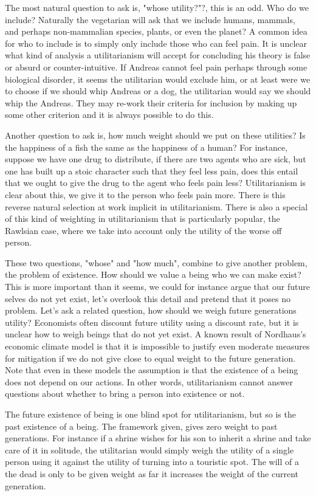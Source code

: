 \documentclass[12pt]{report}
\numberwithin{equation}{section}
\begin{document}
The most natural question to ask is, "whose utility?"?, this is an odd. Who do we include? Naturally the vegetarian will ask that we include humans, mammals, and perhaps non-mammalian species, plants, or even the planet? A common idea for who to include is to simply only include those who can feel pain. It is unclear what kind of analysis a utilitarianism will accept for concluding his theory is false or absurd or counter-intuitive. If Andreas cannot feel pain perhaps through some biological disorder, it seems the utilitarian would exclude him, or at least were we to choose if we should whip Andreas or a dog, the utilitarian would say we should whip the Andreas.  They may re-work their criteria for inclusion by making up some other criterion and it is always possible to do this. 

Another question to ask is, how much weight should we put on these utilities? Is the happiness of a fish the same as the happiness of a human? For instance, suppose we have one drug to distribute, if there are two agents who are sick, but one has built up a stoic character such that they feel less pain, does this entail that we ought to give the drug to the agent who feels pain less? Utilitarianism is clear about this, we give it to the person who feels pain more. There is this reverse natural selection at work implicit in utilitarianism. There is also a special of this kind of weighting in utilitarianism that is particularly popular, the Rawlsian case, where we take into account only the utility of the worse off person. 

These two questions, "whose" and "how much", combine to give another problem, the problem of existence. How should we value a being who we can make exist? This is more important than it seems, we could for instance argue that our future selves do not yet exist, let's overlook this detail and pretend that it poses no problem. Let's ask a related question, how should we weigh future generations utility? Economists often discount future utility using a discount rate, but it is unclear how to weigh beings that do not yet exist. A known result of Nordhaus's economic climate model is that it is impossible to justify even moderate measures for mitigation if we do not give close to equal weight to the future generation. Note that even in these models the assumption is that the existence of a being does not depend on our actions. In other words, utilitarianism cannot answer questions about whether to bring a person into existence or not.

The future existence of being is one blind spot for utilitarianism, but so is the past existence of a being. The framework given, gives zero weight to past generations. For instance if a shrine wishes for his son to inherit a shrine and take care of it in solitude, the utilitarian would simply weigh the utility of a single person using it against the utility of turning into a touristic spot. The will of a the dead is only to be given weight as far it increases the weight of the current generation. 
\end{document}
